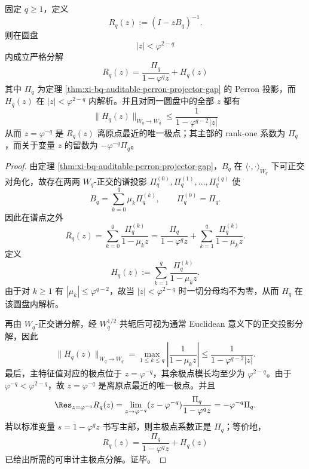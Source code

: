 \begin{theorem}\label{thm:xi-bq-auditable-resolvent-pole-remainder}
固定 \(q\ge 1\)，定义
\[
R_q(z):=(I-zB_q)^{-1}.
\]
则在圆盘
\[
|z|<\varphi^{2-q}
\]
内成立严格分解
\[
\boxed{\;
R_q(z)=\frac{\Pi_q}{1-\varphi^q z}+H_q(z)\;}
\]
其中 \(\Pi_q\) 为定理 \ref{thm:xi-bq-auditable-perron-projector-gap} 的 Perron 投影，而 \(H_q(z)\) 在 \(|z|<\varphi^{2-q}\) 内解析。并且对同一圆盘中的全部 \(z\) 都有
\[
\boxed{\;
\|H_q(z)\|_{W_q\to W_q}
\le
\frac{1}{1-\varphi^{q-2}|z|}\;}
\]
从而 \(z=\varphi^{-q}\) 是 \(R_q(z)\) 离原点最近的唯一极点；其主部的 rank-one 系数为 \(\Pi_q\)，而关于变量 \(z\) 的留数为 \(-\varphi^{-q}\Pi_q\)。
\end{theorem}
\begin{proof}
由定理 \ref{thm:xi-bq-auditable-perron-projector-gap}，\(B_q\) 在 \(\langle\cdot,\cdot\rangle_{W_q}\) 下可正交对角化，故存在两两 \(W_q\)-正交的谱投影
\(\Pi_q^{(0)},\Pi_q^{(1)},\dots,\Pi_q^{(q)}\) 使
\[
B_q=\sum_{k=0}^{q}\mu_k\Pi_q^{(k)},
\qquad
\Pi_q^{(0)}=\Pi_q.
\]
因此在谱点之外
\[
R_q(z)=\sum_{k=0}^{q}\frac{\Pi_q^{(k)}}{1-\mu_k z}
=
\frac{\Pi_q}{1-\varphi^q z}
+\sum_{k=1}^{q}\frac{\Pi_q^{(k)}}{1-\mu_k z}.
\]
定义
\[
H_q(z):=\sum_{k=1}^{q}\frac{\Pi_q^{(k)}}{1-\mu_k z}.
\]
由于对 \(k\ge 1\) 有 \(|\mu_k|\le \varphi^{q-2}\)，故当 \(|z|<\varphi^{2-q}\) 时一切分母均不为零，从而 \(H_q\) 在该圆盘内解析。

再由 \(W_q\)-正交谱分解，经 \(W_q^{1/2}\) 共轭后可视为通常 Euclidean 意义下的正交投影分解，因此
\[
\|H_q(z)\|_{W_q\to W_q}
=
\max_{1\le k\le q}\left|\frac{1}{1-\mu_k z}\right|
\le
\frac{1}{1-\varphi^{q-2}|z|}.
\]
最后，主特征值对应的极点位于 \(z=\varphi^{-q}\)，其余极点模长均至少为 \(\varphi^{2-q}\)。由于
\(
\varphi^{-q}<\varphi^{2-q}
\)，故 \(z=\varphi^{-q}\) 是离原点最近的唯一极点。并且
\[
\Res_{z=\varphi^{-q}}R_q(z)
=
\lim_{z\to\varphi^{-q}}(z-\varphi^{-q})\frac{\Pi_q}{1-\varphi^q z}
=
-\varphi^{-q}\Pi_q.
\]
若以标准变量 \(s=1-\varphi^q z\) 书写主部，则主极点系数正是 \(\Pi_q\)；等价地，
\[
R_q(z)=\frac{\Pi_q}{1-\varphi^q z}+H_q(z)
\]
已给出所需的可审计主极点分解。证毕。
\end{proof}

\endinput
